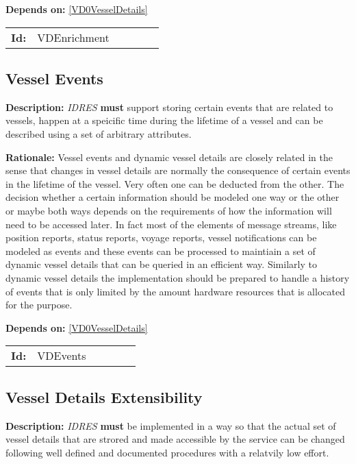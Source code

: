 \textbf{Depends on:} \ref{VD0VesselDetails} 

\par
{\small \begin{center}\begin{tabular}{rlrlrl}
\textbf{Id:} & VDEnrichment  & & & \end{tabular}\end{center} }

\subsection{Vessel Events}\label{VDEvents}
\textbf{Description:} \textsl{IDRES} \textbf{must} support storing certain events that are related to vessels, happen at a speicific time during  the lifetime of a vessel and can be described using a set of  arbitrary attributes.

\textbf{Rationale:} Vessel events and dynamic vessel details are closely related in the sense that changes in vessel details are normally the consequence of certain events in the lifetime of the vessel. Very often one can be  deducted from the other. The decision whether a certain information should be modeled one way or the other or maybe both ways depends on the  requirements of how the information will need to be accessed later. In fact most of the elements of message streams, like position reports, status reports, voyage reports,  vessel notifications can be modeled as events and these events can be  processed to maintiain a set of dynamic vessel details that can be  queried in an efficient way. Similarly to dynamic vessel details the  implementation should be prepared to handle a history of events that is  only limited by the amount hardware resources that is allocated for the  purpose. 

\textbf{Depends on:} \ref{VD0VesselDetails} 

\par
{\small \begin{center}\begin{tabular}{rlrlrl}
\textbf{Id:} & VDEvents  & & & \end{tabular}\end{center} }

\subsection{Vessel Details Extensibility}\label{VDExtensibility}
\textbf{Description:} \textsl{IDRES} \textbf{must} be implemented in a way so that the actual set of vessel details that are strored and made accessible  by the service can be changed following well defined and documented procedures with a relatvily low effort.


